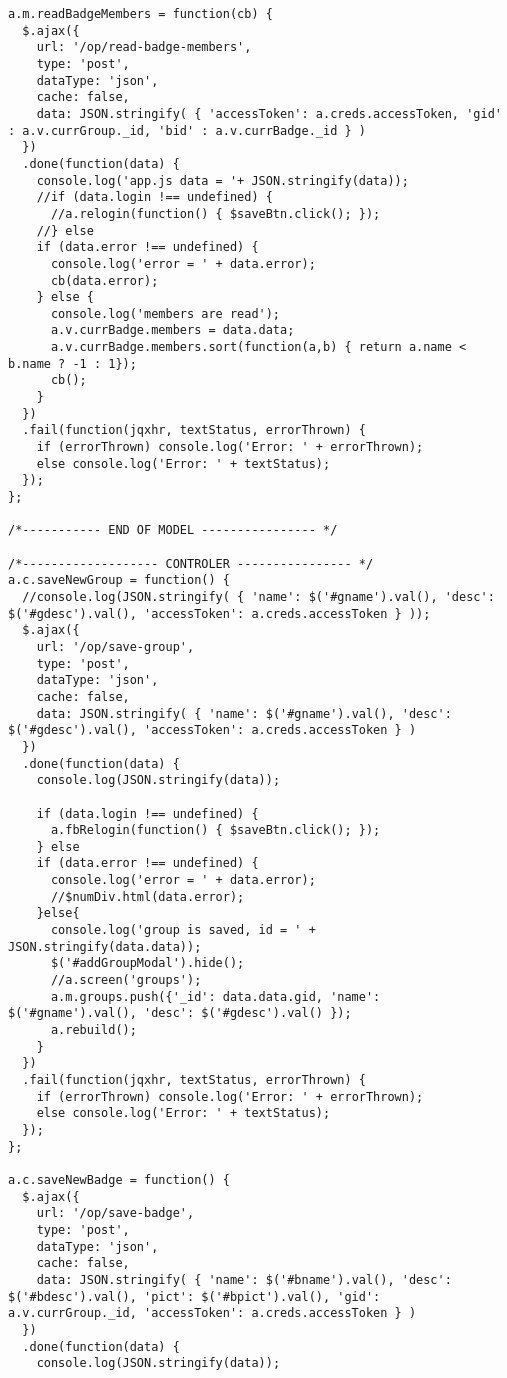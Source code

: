 \begin{lstlisting}
a.m.readBadgeMembers = function(cb) { 
  $.ajax({
    url: '/op/read-badge-members',
    type: 'post',
    dataType: 'json',
    cache: false,
    data: JSON.stringify( { 'accessToken': a.creds.accessToken, 'gid' : a.v.currGroup._id, 'bid' : a.v.currBadge._id } )
  })
  .done(function(data) {
    console.log('app.js data = '+ JSON.stringify(data));
    //if (data.login !== undefined) {
      //a.relogin(function() { $saveBtn.click(); });
    //} else 
    if (data.error !== undefined) {
      console.log('error = ' + data.error);
      cb(data.error);
    } else {
      console.log('members are read');
      a.v.currBadge.members = data.data;
      a.v.currBadge.members.sort(function(a,b) { return a.name < b.name ? -1 : 1});
      cb();
    }
  })
  .fail(function(jqxhr, textStatus, errorThrown) {
    if (errorThrown) console.log('Error: ' + errorThrown);
    else console.log('Error: ' + textStatus);
  });
}; 

/*----------- END OF MODEL ---------------- */

/*------------------- CONTROLER ---------------- */
a.c.saveNewGroup = function() { 
  //console.log(JSON.stringify( { 'name': $('#gname').val(), 'desc': $('#gdesc').val(), 'accessToken': a.creds.accessToken } ));
  $.ajax({
    url: '/op/save-group',
    type: 'post',
    dataType: 'json',
    cache: false,
    data: JSON.stringify( { 'name': $('#gname').val(), 'desc': $('#gdesc').val(), 'accessToken': a.creds.accessToken } )
  })
  .done(function(data) {
    console.log(JSON.stringify(data));
    
    if (data.login !== undefined) {
      a.fbRelogin(function() { $saveBtn.click(); });
    } else 
    if (data.error !== undefined) {
      console.log('error = ' + data.error);
      //$numDiv.html(data.error);
    }else{
      console.log('group is saved, id = ' + JSON.stringify(data.data));
      $('#addGroupModal').hide();
      //a.screen('groups');
      a.m.groups.push({'_id': data.data.gid, 'name': $('#gname').val(), 'desc': $('#gdesc').val() });
      a.rebuild();
    }
  })
  .fail(function(jqxhr, textStatus, errorThrown) {
    if (errorThrown) console.log('Error: ' + errorThrown);
    else console.log('Error: ' + textStatus);
  });
}; 

a.c.saveNewBadge = function() { 
  $.ajax({
    url: '/op/save-badge',
    type: 'post',
    dataType: 'json',
    cache: false,
    data: JSON.stringify( { 'name': $('#bname').val(), 'desc': $('#bdesc').val(), 'pict': $('#bpict').val(), 'gid': a.v.currGroup._id, 'accessToken': a.creds.accessToken } )
  })
  .done(function(data) {
    console.log(JSON.stringify(data));
    

\end{lstlisting}
